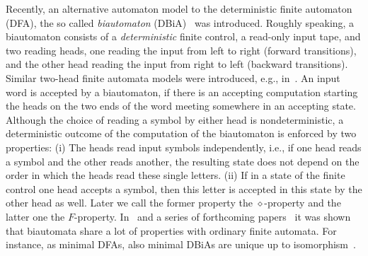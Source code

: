 \documentclass[submission]{eptcs}
\newcommand{\dfa}{\textrm{DFA}}
\newcommand{\dbia}{\textrm{DBiA}}
\begin{document}
Recently, an alternative automaton model to the deterministic finite
automaton (\dfa), the so called \emph{biautomaton}
(\dbia)~\cite{KlPo12} was introduced. Roughly speaking, a biautomaton
consists of a \emph{deterministic} finite control, a read-only input
tape, and two reading heads, one reading the input from left to right
(forward transitions), and the other head reading the input from right
to left (backward transitions). Similar two-head finite automata
models were introduced, e.g., in~\cite{CDJM13a,Lo07,Ro67}. An input
word is accepted by a biautomaton, if there is an accepting
computation starting the heads on the two ends of the word meeting
somewhere in an accepting state.  Although the choice of reading a
symbol by either head is nondeterministic, a deterministic outcome of
the computation of the biautomaton is enforced by two properties: (i)
The heads read input symbols independently, i.e., if one head reads a
symbol and the other reads another, the resulting state does not
depend on the order in which the heads read these single letters. (ii)
If in a state of the finite control one head accepts a symbol, then
this letter is accepted in this state by the other head as well.
Later we call the former property the $\diamond$-property and the
latter one the $F$-property.  In~\cite{KlPo12} and a series of
forthcoming papers~\cite{HoJa13c,HoJa13a,JiKl12,KlPo12a} it was shown
that biautomata share a lot of properties with ordinary finite
automata. For instance, as minimal \dfa s, also minimal \dbia s are
unique up to isomorphism~\cite{Ar69,KlPo12}.
\end{document}
